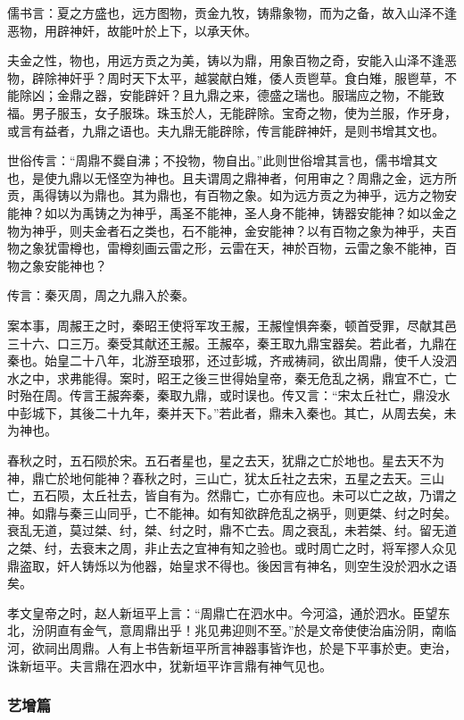 \documentclass[]{article}
\begin{document}
儒书言：夏之方盛也，远方图物，贡金九牧，铸鼎象物，而为之备，故入山泽不逢恶物，用辟神奸，故能叶於上下，以承天休。

夫金之性，物也，用远方贡之为美，铸以为鼎，用象百物之奇，安能入山泽不逢恶物，辟除神奸乎？周时天下太平，越裳献白雉，倭人贡鬯草。食白雉，服鬯草，不能除凶；金鼎之器，安能辟奸？且九鼎之来，德盛之瑞也。服瑞应之物，不能致福。男子服玉，女子服珠。珠玉於人，无能辟除。宝奇之物，使为兰服，作牙身，或言有益者，九鼎之语也。夫九鼎无能辟除，传言能辟神奸，是则书增其文也。

世俗传言：``周鼎不爨自沸；不投物，物自出。''此则世俗增其言也，儒书增其文也，是使九鼎以无怪空为神也。且夫谓周之鼎神者，何用审之？周鼎之金，远方所贡，禹得铸以为鼎也。其为鼎也，有百物之象。如为远方贡之为神乎，远方之物安能神？如以为禹铸之为神乎，禹圣不能神，圣人身不能神，铸器安能神？如以金之物为神乎，则夫金者石之类也，石不能神，金安能神？以有百物之象为神乎，夫百物之象犹雷樽也，雷樽刻画云雷之形，云雷在天，神於百物，云雷之象不能神，百物之象安能神也？

传言：秦灭周，周之九鼎入於秦。

案本事，周赧王之时，秦昭王使将军攻王赧，王赧惶惧奔秦，顿首受罪，尽献其邑三十六、口三万。秦受其献还王赧。王赧卒，秦王取九鼎宝器矣。若此者，九鼎在秦也。始皇二十八年，北游至琅邪，还过彭城，齐戒祷祠，欲出周鼎，使千人没泗水之中，求弗能得。案时，昭王之後三世得始皇帝，秦无危乱之祸，鼎宜不亡，亡时殆在周。传言王赧奔秦，秦取九鼎，或时误也。传又言：``宋太丘社亡，鼎没水中彭城下，其後二十九年，秦并天下。''若此者，鼎未入秦也。其亡，从周去矣，未为神也。

春秋之时，五石陨於宋。五石者星也，星之去天，犹鼎之亡於地也。星去天不为神，鼎亡於地何能神？春秋之时，三山亡，犹太丘社之去宋，五星之去天。三山亡，五石陨，太丘社去，皆自有为。然鼎亡，亡亦有应也。未可以亡之故，乃谓之神。如鼎与秦三山同乎，亡不能神。如有知欲辟危乱之祸乎，则更桀、纣之时矣。衰乱无道，莫过桀、纣，桀、纣之时，鼎不亡去。周之衰乱，未若桀、纣。留无道之桀、纣，去衰末之周，非止去之宜神有知之验也。或时周亡之时，将军摎人众见鼎盗取，奸人铸烁以为他器，始皇求不得也。後因言有神名，则空生没於泗水之语矣。

孝文皇帝之时，赵人新垣平上言：``周鼎亡在泗水中。今河溢，通於泗水。臣望东北，汾阴直有金气，意周鼎出乎！兆见弗迎则不至。''於是文帝使使治庙汾阴，南临河，欲祠出周鼎。人有上书告新垣平所言神器事皆诈也，於是下平事於吏。吏治，诛新垣平。夫言鼎在泗水中，犹新垣平诈言鼎有神气见也。

\hypertarget{header-n344}{%
\subsubsection{艺增篇}\label{header-n344}}
\end{document}
